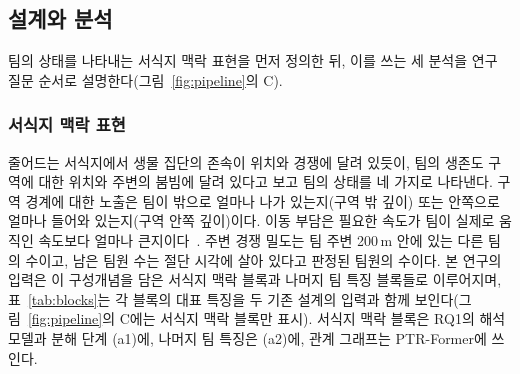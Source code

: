 \subsection{설계와 분석}
\label{sec:method:design}
팀의 상태를 나타내는 서식지 맥락 표현을 먼저 정의한 뒤, 이를 쓰는 세 분석을 연구 질문 순서로 설명한다(그림~\ref{fig:pipeline}의 C).

\subsubsection{서식지 맥락 표현}
\label{sec:method:representation}
줄어드는 서식지에서 생물 집단의 존속이 위치와 경쟁에 달려 있듯이, 팀의 생존도 구역에 대한 위치와 주변의 붐빔에 달려 있다고 보고 팀의 상태를 네 가지로 나타낸다.
구역 경계에 대한 노출은 팀이  밖으로 얼마나 나가 있는지(구역 밖 깊이) 또는 안쪽으로 얼마나 들어와 있는지(구역 안쪽 깊이)이다.
이동 부담은  필요한 속도가 팀이 실제로 움직인 속도보다 얼마나 큰지이다~\cite{Nathan08}. 
주변 경쟁 밀도는 팀 주변 200\,m 안에 있는 다른 팀의 수이고, 남은 팀원 수는 절단 시각에 살아 있다고 판정된 팀원의 수이다.
본 연구의 입력은 이 구성개념을 담은 서식지 맥락 블록과 나머지 팀 특징 블록들로 이루어지며, 표~\ref{tab:blocks}는 각 블록의 대표 특징을 두 기존 설계의 입력과 함께 보인다(그림~\ref{fig:pipeline}의 C에는 서식지 맥락 블록만 표시). 서식지 맥락 블록은 RQ1의 해석 모델과 분해 단계 (a1)에, 나머지 팀 특징은 (a2)에, 관계 그래프는 PTR-Former에 쓰인다.

